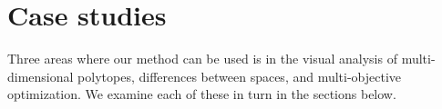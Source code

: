 \section{Case studies}
\label{sec:case_studies}

Three areas where our method can be used is in the visual analysis of
multi-dimensional polytopes, differences between spaces, and multi-objective
optimization. We examine each of these in turn in the sections below.





